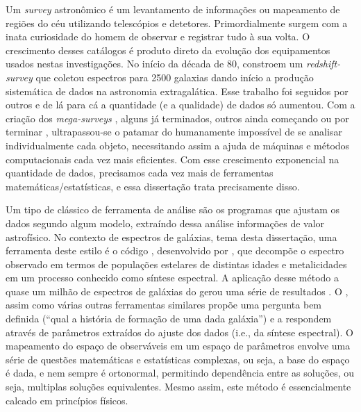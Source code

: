 Um {\em survey} astronômico é um levantamento de informações ou mapeamento de regiões do céu utilizando telescópios e
detetores. Primordialmente surgem com a inata curiosidade do homem de observar e registrar tudo à sua volta. O
crescimento desses catálogos é produto direto da evolução dos equipamentos usados nestas investigações. No início da
década de 80, \citet{Huchra1983} constroem um {\em redshift-survey} que coletou espectros para 2500 galaxias dando
início a produção sistemática de dados na astronomia extragalática. Esse trabalho foi seguidos por outros \citep[e.g.,
][]{Huchra1988, DaCosta1988} e de lá para cá a quantidade (e a qualidade) de dados só aumentou. Com a criação dos {\em
mega-surveys} \citep[\SDSS, 2dFGRS, 2MASS; ][]{York2000, Colless1999, Skrutskie2006}, alguns já terminados, outros ainda
começando ou por terminar \citep[LSST, JPAS; ][]{Ivezic2008, Benitez2009}, ultrapassou-se o patamar do humanamente
impossível de se analisar individualmente cada objeto, necessitando assim a ajuda de máquinas e métodos computacionais
cada vez mais eficientes. Com esse crescimento exponencial na quantidade de dados, precisamos cada vez mais de
ferramentas matemáticas/estatísticas, e essa dissertação trata precisamente disso.

Um tipo de clássico de ferramenta de análise são os programas que ajustam os dados segundo algum modelo, extraíndo dessa
análise informações de valor astrofísico. No contexto de espectros de galáxias, tema desta dissertação, uma ferramenta
deste estilo é o código \starlight, desenvolvido por \citet{CidFernandes2005}, que decompõe o espectro observado em
termos de populações estelares de distintas idades e metalicidades em um processo conhecido como síntese espectral.
A aplicação desse método a quase um milhão de espectros de galáxias do \SDSS gerou uma série de resultados \citep[e.g.,
][]{Asari2007, Asari2009, CidFernandes2007, Mateus2007}. O \starlight, assim como várias outras ferramentas similares
\citep{Panter2003, Gallazzi2005, Ocvirk2006} propõe uma pergunta bem definida (``qual a história de formação de
uma dada galáxia'') e a respondem através de parâmetros extraídos do ajuste dos dados (i.e., da síntese espectral). O
mapeamento do espaço de observáveis em um espaço de parâmetros envolve uma série de questões matemáticas e estatísticas
complexas, ou seja, a base do espaço é dada, e nem sempre é ortonormal, permitindo dependência entre as soluções, ou
seja, multiplas soluções equivalentes. Mesmo assim, este método é essencialmente calcado em princípios físicos.

